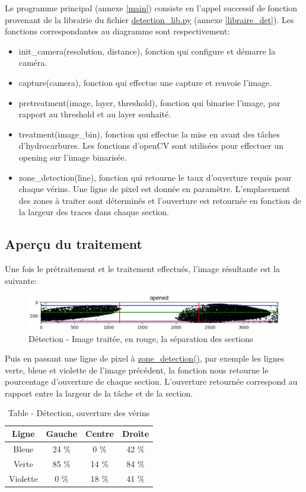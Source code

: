 Le programme principal (annexe \ref{main}) consiste en l'appel successif de fonction provenant de la librairie du fichier \underline{detection\_lib.py} (annexe \ref{libraire_det}).
Les fonctions correspondantes au diagramme sont respectivement:
\begin{itemize}
    \item init\_camera(resolution, distance), fonction qui configure et démarre la caméra.
    \item capture(camera), fonction qui effectue une capture et renvoie l'image.
    \item pretreatment(image, layer, threshold), fonction qui binarise l'image, par rapport au threshold et au layer souhaité.
    \item treatment(image\_bin), fonction qui effectue la mise en avant des tâches d'hydrocarbures. Les fonctions d'openCV sont utilisées pour effectuer un opening sur l'image binarisée.
    \item zone\_detection(line), fonction qui retourne le taux d'ouverture requis pour chaque vérins. Une ligne de pixel est donnée en paramètre. L'emplacement des zones à traiter sont déterminés et l'ouverture est retournée en fonction de la largeur des traces dans chaque section.
\end{itemize}

\subsection{Aperçu du traitement}
Une fois le prétraitement et le traitement effectués, l'image résultante est la suivante:

\begin{figure}[H]
    \centering
    \includegraphics[width=13cm]{assets/figures/traitement1.PNG}
    \caption{Détection - Image traitée, en rouge, la séparation des sections}
\end{figure}

Puis en passant une ligne de pixel à \underline{zone\_detection()}, par exemple les lignes verte, bleue et violette de l'image précédent, la fonction
nous retourne le pourcentage d'ouverture de chaque section. L'ouverture retournée correspond au rapport entre la largeur de la tâche et de la section.

\begin{table}[H]
    \begin{center}
        \caption{Table - Détection, ouverture des vérins}
        \begin{tabular}{|c|c|c|c|}
            Ligne    & Gauche & Centre & Droite \\ \hline
            Bleue    & 24 \%  & 0 \%   & 42 \%  \\
            Verte    & 85 \%  & 14 \%  & 84 \%  \\
            Violette & 0 \%   & 18 \%  & 41 \%  \\
        \end{tabular}
    \end{center}
\end{table}